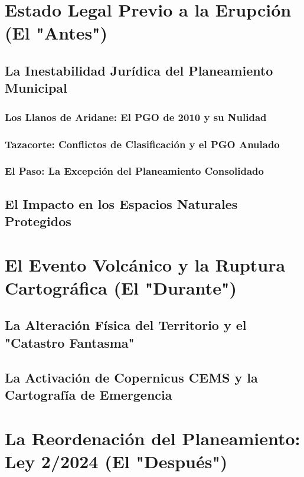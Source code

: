 \documentclass[11pt, a4paper]{article}
\begin{document}
\section{Estado Legal Previo a la Erupción (El "Antes")}
\subsection{La Inestabilidad Jurídica del Planeamiento Municipal}
\subsubsection{Los Llanos de Aridane: El PGO de 2010 y su Nulidad}
\subsubsection{Tazacorte: Conflictos de Clasificación y el PGO Anulado}
\subsubsection{El Paso: La Excepción del Planeamiento Consolidado}
\subsection{El Impacto en los Espacios Naturales Protegidos}

\section{El Evento Volcánico y la Ruptura Cartográfica (El "Durante")}
\subsection{La Alteración Física del Territorio y el "Catastro Fantasma"}
\subsection{La Activación de Copernicus CEMS y la Cartografía de Emergencia}

\section{La Reordenación del Planeamiento: Ley 2/2024 (El "Después")}
\end{document}
